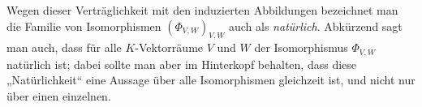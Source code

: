 \begin{remark}
  Wegen dieser Verträglichkeit mit den induzierten Abbildungen bezeichnet man die Familie von Isomorphismen $(\Phi_{V,W})_{V,W}$ auch als \emph{natürlich}.
  Abkürzend sagt man auch, dass für alle $K$-Vektorräume $V$ und $W$ der Isomorphismus $\Phi_{V,W}$ natürlich ist;
  dabei sollte man aber im Hinterkopf behalten, dass diese „Natürlichkeit“ eine Aussage über alle Isomorphismen gleichzeit ist, und nicht nur über einen einzelnen.
\end{remark}














